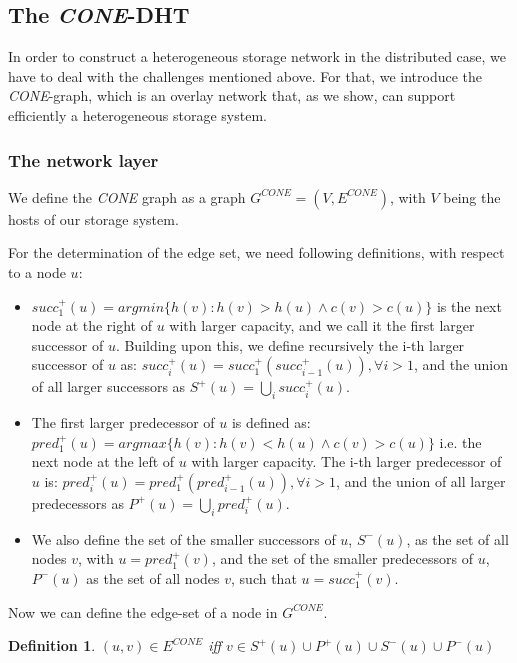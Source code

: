 \documentclass[11pt]{article}
\newtheorem{definition}[theorem]{Definition}
\begin{document}
\subsection{The \emph{CONE}-DHT}\label{cone}

In order to construct a heterogeneous storage network in the distributed case, we have to deal with the challenges mentioned above.
For that, we introduce the  \emph{CONE}-graph, which is an overlay network that, as we show, can support efficiently a heterogeneous storage system.

\subsubsection{The network layer}

We define the \emph{CONE} graph as a graph $G^{CONE}=(V,E^{CONE})$, with $V$ being the hosts of our storage system.

For the determination of the edge set, we need following definitions, with respect to a node $u$:

 \begin{itemize}\itemsep0.1pt
\item $succ^+_1(u)=argmin\{h(v):h(v)>h(u) \wedge c(v)>c(u)\}$
is the next node at the right of $u$ with larger capacity, and we call it the first larger successor of $u$.
Building upon this, we define recursively the i-th larger successor of $u$ as:
$succ^+_i(u)=succ^+_1(succ^+_{i-1}(u)), \forall i>1$, and the union of all larger successors as
 $S^+(u)=\bigcup_{ i} succ^+_i(u)$.

\item The first larger predecessor of $u$ is defined as:
 $pred^+_1(u)=argmax\{h(v):h(v)<h(u) \wedge c(v)>c(u)\}$
i.e. the next node at the left of $u$ with larger capacity. The i-th larger predecessor of $u$ is:
 $pred^+_i(u)=pred^+_1(pred^+_{i-1}(u)), \forall i>1$, and the union of all larger predecessors as
 $P^+(u)=\bigcup_{ i} pred^+_i(u)$.

\item We also define the set of the smaller successors of $u$, $S^-(u)$, as the set of all nodes $v$, with $u=pred_1^+(v)$, and the set of the smaller predecessors of $u$, $P^-(u)$ as the set of all nodes $v$, such that $u=succ_1^+(v)$.

\end{itemize}

Now we can define the edge-set of a node in $G^{CONE}$.
 
\begin{definition}
$(u,v) \in E^{CONE}$ iff $v \in S^+(u) \cup P^+(u) \cup S^-(u) \cup P^-(u)$
\end{definition}
\end{document}
